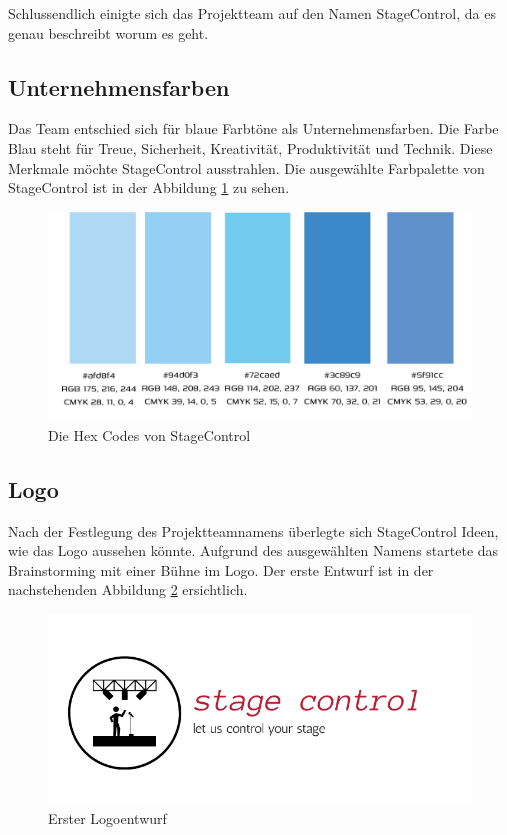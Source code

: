 Schlussendlich einigte sich das Projektteam auf den Namen StageControl, da es genau beschreibt worum es geht.

\newpage
\subsection{Unternehmensfarben}
Das Team entschied sich für blaue Farbtöne als Unternehmensfarben. Die Farbe Blau steht für Treue, Sicherheit, Kreativität, Produktivität und Technik. \parencite{BedeutungderFarbeBlau} Diese Merkmale möchte StageControl ausstrahlen. Die ausgewählte Farbpalette von StageControl ist in der Abbildung \ref{fig:Hexcode} zu sehen. 

\begin{figure}[H]
	\centering
	\includegraphics[width=0.7\linewidth]{images/Hexcode.png}
	\caption[Die Hex Codes von StageControl]{Die Hex Codes von StageControl}
	\label{fig:Hexcode}
\end{figure}


\subsection{Logo}
Nach der Festlegung des Projektteamnamens überlegte sich StageControl Ideen, wie das Logo aussehen könnte. Aufgrund des ausgewählten Namens startete das Brainstorming mit einer Bühne im Logo. Der erste Entwurf ist in der nachstehenden Abbildung \ref{fig:Logoentwurf1} ersichtlich. 

\begin{figure}[H]
	\centering
	\includegraphics[width=0.5\linewidth]{images/Logoentwurf1.png}
	\caption[Erster Logoentwurf]{Erster Logoentwurf}
	\label{fig:Logoentwurf1}
\end{figure}

